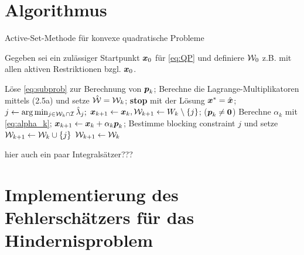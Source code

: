 \section{Algorithmus}
\label{anhang:B.3}

\begin{algorithm}[H]
\caption{Active-Set-Methode für konvexe quadratische Probleme}
Gegeben sei ein zulässiger Startpunkt $\boldsymbol x_0$ für \eqref{eq:QP} und definiere $\mathcal W_0$ z.B. mit allen aktiven Restriktionen bzgl. $\boldsymbol x_0$.
\begin{algorithmic}
\State Löse \eqref{eq:subprob} zur Berechnung von $\boldsymbol p_k$;
\State Berechne die Lagrange-Multiplikatoren mittels (2.5a)
\State \quad und setze $\hat{\mathcal W} = \mathcal W_k$;
\State \textbf{stop} mit der Lösung $\boldsymbol x^* = \hat{\boldsymbol x}$;
\Else
\State $j \leftarrow \arg\min_{j\in \mathcal W_k \cap \mathcal I} \hat\lambda_j;$
\State $\boldsymbol x_{k+1} \leftarrow \boldsymbol x_k, \mathcal W_{k+1} \leftarrow W_k \setminus \{j\}$;
\EndIf
\Else \quad ($\boldsymbol p_k \not= \boldsymbol 0$)
\State Berechne $\alpha_k$ mit \eqref{eq:alpha_k};
\State $\boldsymbol x_{k+1} \leftarrow  \boldsymbol x_k + \alpha_k\boldsymbol p_k$;
\State Bestimme  blocking constraint $j$ und setze $\mathcal W_{k+1} \leftarrow \mathcal W_k \cup \{j\}$
\Else
\State $\mathcal W_{k+1} \leftarrow \mathcal W_k$
\EndIf
\EndIf
\EndFor
\end{algorithmic}
\end{algorithm}







\label{anhang:C}

hier auch ein paar Integralsätzer???






\label{anhang:D}

\section{Implementierung des Fehlerschätzers für das Hindernisproblem}




